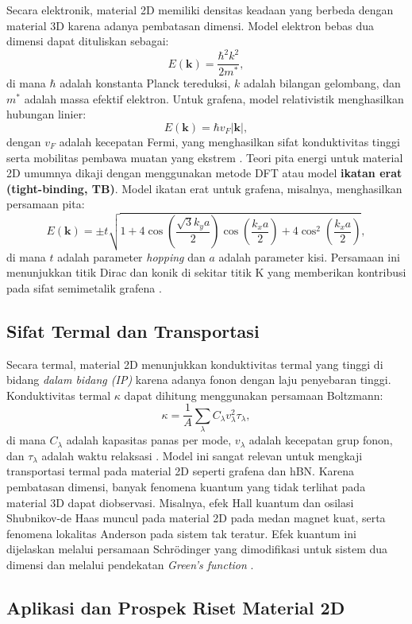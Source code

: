 Secara elektronik, material 2D memiliki densitas keadaan yang berbeda dengan material 3D karena adanya pembatasan dimensi. Model elektron bebas dua dimensi dapat dituliskan sebagai:
\begin{equation}
    E(\mathbf{k}) = \frac{\hbar^2 k^2}{2m^*},
\end{equation}
di mana \( \hbar \) adalah konstanta Planck tereduksi, \( k \) adalah bilangan gelombang, dan \( m^* \) adalah massa efektif elektron. Untuk grafena, model relativistik menghasilkan hubungan linier:
\begin{equation}
    E(\mathbf{k}) = \hbar v_F |\mathbf{k}|,
\end{equation}
dengan \( v_F \) adalah kecepatan Fermi, yang menghasilkan sifat konduktivitas tinggi serta mobilitas pembawa muatan yang ekstrem \citep{Novoselov2004,CastroNeto2009}. Teori pita energi untuk material 2D umumnya dikaji dengan menggunakan metode DFT atau model \textbf{ikatan erat (tight-binding, TB)}. Model ikatan erat untuk grafena, misalnya, menghasilkan persamaan pita:
\begin{equation}
    E(\mathbf{k}) = \pm t \sqrt{1 + 4\cos\left(\frac{\sqrt{3}k_y a}{2}\right)\cos\left(\frac{k_x a}{2}\right) + 4\cos^2\left(\frac{k_x a}{2}\right)},
\end{equation}
di mana \( t \) adalah parameter \emph{hopping} dan \( a \) adalah parameter kisi. Persamaan ini menunjukkan titik Dirac dan konik di sekitar titik K yang memberikan kontribusi pada sifat semimetalik grafena \citep{CastroNeto2009}. \subsection{Sifat Termal dan Transportasi}
Secara termal, material 2D menunjukkan konduktivitas termal yang tinggi di bidang \emph{dalam bidang (IP)} karena adanya fonon dengan laju penyebaran tinggi. Konduktivitas termal \(\kappa\) dapat dihitung menggunakan persamaan Boltzmann:
\begin{equation}
    \kappa = \frac{1}{A} \sum_{\lambda} C_{\lambda} v_{\lambda}^2 \tau_{\lambda},
\end{equation}
di mana \( C_{\lambda} \) adalah kapasitas panas per mode, \( v_{\lambda} \) adalah kecepatan grup fonon, dan \( \tau_{\lambda} \) adalah waktu relaksasi \citep{Das2015}. Model ini sangat relevan untuk mengkaji transportasi termal pada material 2D seperti grafena dan hBN. Karena pembatasan dimensi, banyak fenomena kuantum yang tidak terlihat pada material 3D dapat diobservasi. Misalnya, efek Hall kuantum dan osilasi Shubnikov-de Haas muncul pada material 2D pada medan magnet kuat, serta fenomena lokalitas Anderson pada sistem tak teratur. Efek kuantum ini dijelaskan melalui persamaan Schrödinger yang dimodifikasi untuk sistem dua dimensi dan melalui pendekatan \emph{Green’s function} \citep{ando2002}. \subsection{Aplikasi dan Prospek Riset Material 2D}
